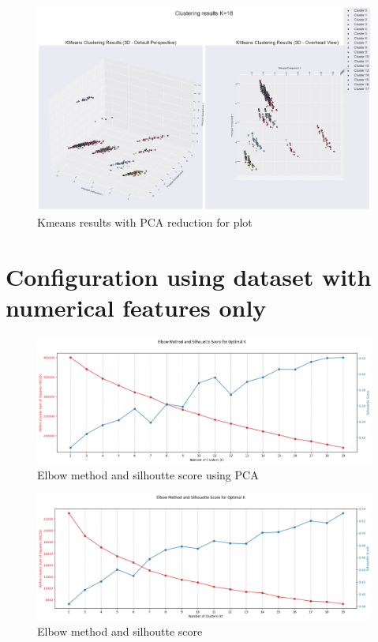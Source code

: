 \documentclass[12pt,a4paper,twoside]{article}
\begin{document}
\begin{figure}[!ht]
    \centering
    \includegraphics[width=\textwidth,height=\textheight,keepaspectratio]{assets/kmeans-one-hot-fancy.png}
    \caption{Kmeans results with PCA reduction for plot}
    \label{fig:}
\end{figure}

\newpage

\section*{Configuration using dataset with numerical features only}

\begin{figure}[!ht]
    \centering
    \includegraphics[width=\textwidth,height=\textheight,keepaspectratio]{assets/elbow-num-pca.png}
    \caption{Elbow method and silhoutte score using PCA}
    \label{fig:}
\end{figure}

\begin{figure}[!ht]
    \centering
    \includegraphics[width=\textwidth,height=\textheight,keepaspectratio]{assets/elbow-num.png}
    \caption{Elbow method and silhoutte score}
    \label{fig:}
\end{figure}
\end{document}
